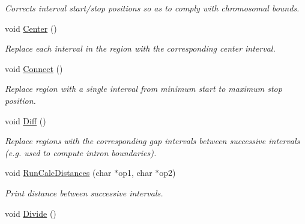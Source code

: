 \begin{CompactItemize}
\begin{CompactList}\small\item\em Corrects interval start/stop positions so as to comply with chromosomal bounds. \item\end{CompactList}\item 
\hypertarget{classGenomicRegionBED_35c692c1343327d9cb450cfa1276096f}{
void \hyperlink{classGenomicRegionBED_35c692c1343327d9cb450cfa1276096f}{Center} ()}
\label{classGenomicRegionBED_35c692c1343327d9cb450cfa1276096f}

\begin{CompactList}\small\item\em Replace each interval in the region with the corresponding center interval. \item\end{CompactList}\item 
\hypertarget{classGenomicRegionBED_d55a9ffea8b0924bac3d11a5722cdfd2}{
void \hyperlink{classGenomicRegionBED_d55a9ffea8b0924bac3d11a5722cdfd2}{Connect} ()}
\label{classGenomicRegionBED_d55a9ffea8b0924bac3d11a5722cdfd2}

\begin{CompactList}\small\item\em Replace region with a single interval from minimum start to maximum stop position. \item\end{CompactList}\item 
\hypertarget{classGenomicRegionBED_9580179a120834e71ac90e56e5f35aa9}{
void \hyperlink{classGenomicRegionBED_9580179a120834e71ac90e56e5f35aa9}{Diff} ()}
\label{classGenomicRegionBED_9580179a120834e71ac90e56e5f35aa9}

\begin{CompactList}\small\item\em Replace regions with the corresponding gap intervals between successive intervals (e.g. used to compute intron boundaries). \item\end{CompactList}\item 
\hypertarget{classGenomicRegionBED_833d50369e61f64603c63b6a05f3d80b}{
void \hyperlink{classGenomicRegionBED_833d50369e61f64603c63b6a05f3d80b}{RunCalcDistances} (char $\ast$op1, char $\ast$op2)}
\label{classGenomicRegionBED_833d50369e61f64603c63b6a05f3d80b}

\begin{CompactList}\small\item\em Print distance between successive intervals. \item\end{CompactList}\item 
\hypertarget{classGenomicRegionBED_be056ec84d2d6890479d47559839bab4}{
void \hyperlink{classGenomicRegionBED_be056ec84d2d6890479d47559839bab4}{Divide} ()}
\label{classGenomicRegionBED_be056ec84d2d6890479d47559839bab4}


\end{CompactItemize}

